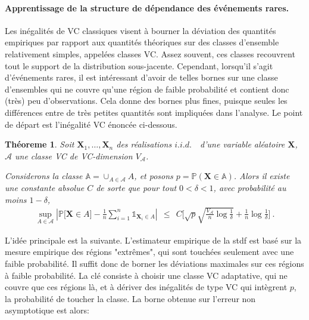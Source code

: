 \documentclass[a4paper, 12pt]{article}
\newtheorem{theoreme}{Théoreme}
\newcommand\iid{\ensuremath{\mathit{i.i.d.}}\ }
\begin{document}
\paragraph{Apprentissage de la structure de dépendance des événements rares.}
Les inégalités de VC classiques visent à bourner la déviation des quantités empiriques par rapport aux quantités théoriques sur des classes d'ensemble relativement simples, appelées classes VC. Assez souvent, ces classes recouvrent tout le support de la distribution sous-jacente. Cependant, lorsqu'il s'agit d'événements rares, il est intéressant d'avoir de telles bornes sur une classe d'ensembles qui ne couvre qu'une région de faible probabilité et contient donc (très) peu d'observations. Cela donne des bornes plus fines, puisque seules les différences entre de très petites quantités sont impliquées dans l'analyse. Le point de départ est l'inégalité VC énoncée ci-dessous. %

\begin{theoreme}
\label{resume_fr:thm-princ} 
Soit $\mathbf{X}_1,\ldots,\mathbf{X}_n$ des réalisations \iid~d'une variable aléatoire $\mathbf{X}$, $\mathcal{A}$  une classe VC de VC-dimension $V_{\mathcal{A}}$. 

Considerons la classe $\mathbb{A} = \cup_{A \in \mathcal{A}} A$, et posons $p = \mathbb{P}(\mathbf{X} \in \mathbb{A})$. 
Alors il existe une constante absolue $ C $ de sorte que pour tout $ 0 <\delta <1 $, avec probabilité au moins $ 1- \delta $,
\begin{align*}
\sup_{A \in \mathcal{A}} \left| \mathbb{P} \big[\mathbf{X} \in A\big] - \frac{1}{n} \sum_{i=1}^n \mathds{1}_{\mathbf{X}_i \in A}  \right| ~~\le~~ C \bigg[ \sqrt{p}\sqrt{\frac{V_{\mathcal{A}}}{n} \log{\frac{1}{\delta}}} + \frac{1}{n} \log{\frac{1}{\delta}} \bigg]~.
\end{align*}
\end{theoreme}

L'idée principale est la suivante. L'estimateur empirique de la {\sc stdf} est basé sur la mesure empirique des régions "extrêmes", qui sont touchées seulement avec une faible probabilité. Il suffit donc de borner les déviations maximales sur ces régions à faible probabilité.
La clé consiste à choisir une classe VC adaptative, qui ne couvre que ces régions là, et à dériver des inégalités de type VC qui intègrent $p$, la probabilité de toucher la classe. La borne obtenue sur l'erreur non asymptotique est alors:
\end{document}

